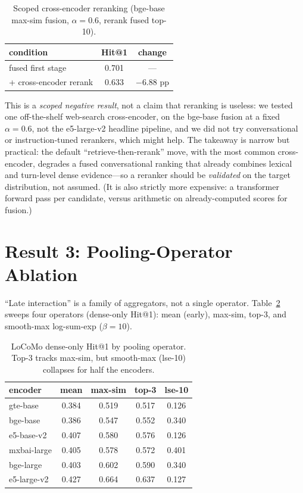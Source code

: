 \documentclass[10pt,twocolumn]{article}
\begin{document}
\begin{table}[t]
\centering\small
\caption{Scoped cross-encoder reranking (bge-base max-sim fusion, $\alpha{=}0.6$,
rerank fused top-10).}
\label{tab:rerank}
\begin{tabular}{lcc}
\toprule
condition & Hit@1 & change \\
\midrule
fused first stage & 0.701 & --- \\
+ cross-encoder rerank & 0.633 & $-6.88$ pp \\
\bottomrule
\end{tabular}
\end{table}

This is a \emph{scoped negative result}, not a claim that reranking is
useless: we tested one off-the-shelf web-search cross-encoder, on the bge-base
fusion at a fixed $\alpha{=}0.6$, not the e5-large-v2 headline pipeline, and we
did not try conversational or instruction-tuned rerankers, which might help.
The takeaway is narrow but practical: the default ``retrieve-then-rerank''
move, with the most common cross-encoder, degrades a fused conversational
ranking that already combines lexical and turn-level dense evidence---so a
reranker should be \emph{validated} on the target distribution, not assumed.
(It is also strictly more expensive: a transformer forward pass per candidate,
versus arithmetic on already-computed scores for fusion.)

\section{Result 3: Pooling-Operator Ablation}
\label{sec:ablation}
``Late interaction'' is a family of aggregators, not a single operator.
Table~\ref{tab:pooling} sweeps four operators (dense-only Hit@1): mean (early),
max-sim, top-3, and smooth-max log-sum-exp ($\beta{=}10$).

\begin{table}[t]
\centering\small
\caption{LoCoMo dense-only Hit@1 by pooling operator. Top-3 tracks max-sim,
but smooth-max (lse-10) collapses for half the encoders.}
\label{tab:pooling}
\begin{tabular}{lcccc}
\toprule
encoder & mean & max-sim & top-3 & lse-10 \\
\midrule
gte-base    & 0.384 & 0.519 & 0.517 & 0.126 \\
bge-base    & 0.386 & 0.547 & 0.552 & 0.340 \\
e5-base-v2  & 0.407 & 0.580 & 0.576 & 0.126 \\
mxbai-large & 0.405 & 0.578 & 0.572 & 0.401 \\
bge-large   & 0.403 & 0.602 & 0.590 & 0.340 \\
e5-large-v2 & 0.427 & 0.664 & 0.637 & 0.127 \\
\bottomrule
\end{tabular}
\end{table}
\end{document}
